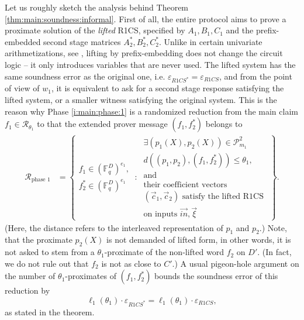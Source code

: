 Let us roughly sketch the analysis behind Theorem \ref{thm:main:soundness:informal}.
First of all, the entire protocol aims to prove a proximate solution of the \textit{lifted} R1CS, specified by $A_1, B_1, C_1$ and the prefix-embedded second stage matrices $A_2^*, B_2^*, C_2^*$.
Unlike in certain univariate arithmetizations, see \cite{liftedFRI}, lifting by prefix-embedding does not change the circuit logic -- it only introduces variables that are never used.
The lifted system has the same soundness error as the original one, i.e. $\varepsilon_{R1CS^*} = \varepsilon_{R1CS}$, and from the point of view of $w_1$, it is equivalent to ask for a second stage response satisfying the lifted system, or a smaller witness satisfying the original system.\footnotemark
{}
This is the reason why Phase \ref{i:main:phase:1} is a randomized reduction from the main claim $f_1\in \mathcal R_{\theta_1}$ to that the extended prover message $(f_1, f_2^*)$ belongs to 
\begin{align}
\label{e:}
\mathcal R_\text{phase 1} 
&=
\left\{
    \begin{matrix}
        f_1 \in \left(\mathbb F_q^{D}\right)^{e_1},%
        \\
        f_2^* \in \left(\mathbb F_q^{D}\right)^{e_1}%
    \end{matrix}
    \::\:
    \begin{matrix}
        \exists (p_1(X),p_2(X)) \in \mathscr P_{m_1}^2 %
        \\
        d((p_1,p_2), (f_1,f_2^*)) \leq \theta_1,
        \\
        \text{and}
        \\
        \text{their coefficient vectors}
        \\
        (\vec c_1, \vec c_2) \text{ satisfy the lifted R1CS }
        \\
        \text{on inputs }\vec{in} , \vec\xi 
    \end{matrix}
\right\}.
\end{align}
(Here, the distance refers to the interleaved representation of $p_1$ and $p_2$.)
Note, that the proximate $p_2(X)$ is not demanded of lifted form, in other words, it is not asked to stem from a $\theta_1$-proximate of the non-lifted word $f_2$ on $D'$.
(In fact, we do not rule out that $f_2$ is not as close to $C'$.)
A usual pigeon-hole argument on the number of $\theta_1$-proximates of $(f_1,f_2^*)$ bounds the soundness error of this reduction by
\[
\ell_1(\theta_1) \cdot \varepsilon_{R1CS^*} = \ell_1(\theta_1)\cdot \varepsilon_{R1CS},
\]
as stated in the theorem.


